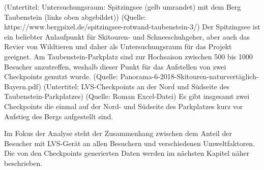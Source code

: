    (Untertitel: Untersuchungsraum: Spitzingsee (gelb umrandet) mit dem Berg Taubenstein (links oben abgebildet))
(Quelle: https://www.bergpixel.de/spitzingsee-rotwand-taubenstein-3/)
Der Spitzingsee ist ein beliebter Anlaufpunkt für Skitouren- und Schneeschuhgeher, aber auch das Revier von Wildtieren und daher als Untersuchungsraum für das Projekt geeignet.  Am Taubenstein-Parkplatz sind zur Hochsaison zwischen 500 bis 1000 Besucher anzutreffen, weshalb dieser Punkt für das Aufstellen von zwei Checkpoints genutzt wurde. (Quelle: Panorama-6-2018-Skitouren-naturvertäglich-Bayern.pdf)
(Untertitel: LVS-Checkpoints an der Nord und Südseite des Taubenstein-Parkplatzes)
(Quelle: Roman Excel-Datei)
Es gibt insgesamt zwei Checkpoints die einmal auf der Nord- und Südseite des Parkplatzes kurz vor Aufstieg des Bergs aufgestellt sind.
   
Im Fokus der Analyse steht der Zusammenhang zwischen dem Anteil der Besucher mit LVS-Gerät an allen Besuchern und verschiedenen Umweltfaktoren. Die von den Checkpoints generierten Daten werden im nächsten Kapitel näher beschrieben. 
